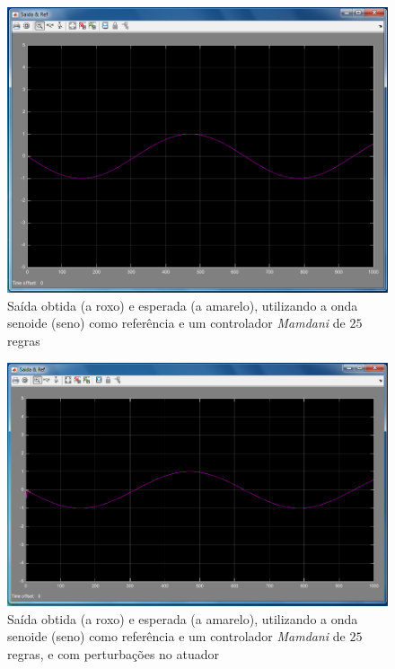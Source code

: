 \documentclass{article}
\begin{document}

\begin{figure}[h]
  \centering
      \includegraphics[scale=0.3]{Images/Mamdani_25_sin.png}
  \caption{Saída obtida (a roxo) e esperada (a amarelo), utilizando a onda senoide (seno) como referência e um controlador \emph{Mamdani} de $25$ regras}
\end{figure}

\begin{figure}[h]
  \centering
      \includegraphics[scale=0.3]{Images/Mamdani_25_sin_actuator.png}
  \caption{Saída obtida (a roxo) e esperada (a amarelo), utilizando a onda senoide (seno) como referência e um controlador \emph{Mamdani} de $25$ regras, e com perturbações no atuador}
\end{figure}
\end{document}
